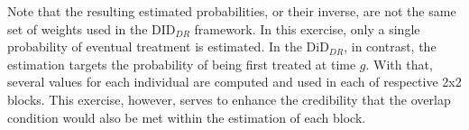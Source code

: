 Note that the resulting estimated probabilities, or their inverse, are not the same set of weights used in the
$\text{DID}_{DR}$ framework. In this exercise, only a single probability of eventual treatment is estimated. In the
$\text{DiD}_{DR}$, in contrast, the estimation targets the probability of being first treated at time $g$. With
that, several values for each individual are computed and used in each of respective 2x2 blocks. This exercise,
however, serves to enhance the credibility that the overlap condition would also be met within the estimation of
each block.



